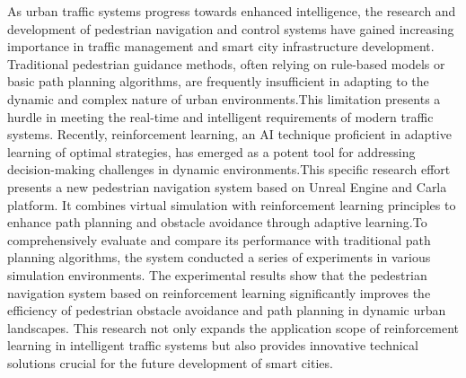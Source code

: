 \begin{abstracten}

As urban traffic systems progress towards enhanced intelligence, the research and development of pedestrian navigation and control systems have gained increasing importance in traffic management and smart city infrastructure development. Traditional pedestrian guidance methods, often relying on rule-based models or basic path planning algorithms, are frequently insufficient in adapting to the dynamic and complex nature of urban environments.This limitation presents a hurdle in meeting the real-time and intelligent requirements of modern traffic systems. Recently, reinforcement learning, an AI technique proficient in adaptive learning of optimal strategies, has emerged as a potent tool for addressing decision-making challenges in dynamic environments.This specific research effort presents a new pedestrian navigation system based on Unreal Engine and Carla platform. It combines virtual simulation with reinforcement learning principles to enhance path planning and obstacle avoidance through adaptive learning.To comprehensively evaluate and compare its performance with traditional path planning algorithms, the system conducted a series of experiments in various simulation environments. The experimental results show that the pedestrian navigation system based on reinforcement learning significantly improves the efficiency of pedestrian obstacle avoidance and path planning in dynamic urban landscapes. This research not only expands the application scope of reinforcement learning in intelligent traffic systems but also provides innovative technical solutions crucial for the future development of smart cities.

\end{abstracten}
